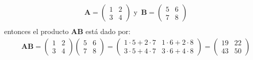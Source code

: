 \begin{}
\begin{example}
$$\begin{aligned}
& \boldsymbol{A}=\left(\begin{array}{ll}
1 & 2 \\
3 & 4
\end{array}\right) \,\,\text{y}\,\,\, \boldsymbol{B}=\left(\begin{array}{ll}
5 & 6 \\
7 & 8
\end{array}\right)\\    
\end{aligned}$$
entonces el producto $\boldsymbol{AB}$ está dado por:
 $$
\begin{aligned}
& \boldsymbol{AB}=\left(\begin{array}{ll}
1 & 2 \\
3 & 4
\end{array}\right) \left(\begin{array}{ll}
5 & 6 \\
7 & 8
\end{array}\right)=\left(\begin{array}{ll}
1 \cdot 5+2 \cdot 7 & 1 \cdot 6+2 \cdot 8 \\
3 \cdot 5+4 \cdot 7 & 3 \cdot 6+4 \cdot 8
\end{array}\right)=\left(\begin{array}{ll}
19 & 22 \\
43 & 50
\end{array}\right) \\
\end{aligned}
$$ 
\end{example}


\end{}
